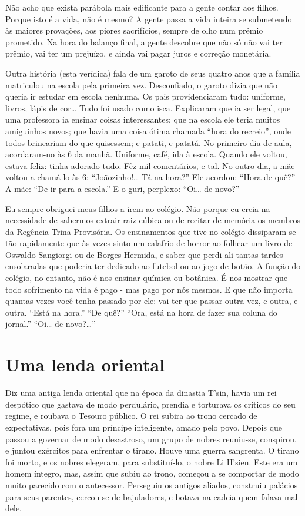 Não acho que exista parábola mais edificante para a gente contar aos
filhos. Porque isto é a vida, não é mesmo?  A gente passa a vida
inteira se submetendo às maiores provações, aos piores sacrifícios,
sempre de olho num prêmio prometido. Na hora do balanço final, a
gente descobre que não só não vai ter prêmio, vai ter um prejuízo, e
ainda vai pagar juros e correção monetária. 

Outra história (esta verídica) fala de um garoto de seus quatro anos
que a família matriculou na escola pela primeira vez. Desconfiado, o
garoto dizia que não queria ir estudar em escola nenhuma. Os pais
providenciaram tudo: uniforme, livros, lápis de cor… Tudo foi usado
como isca. Explicaram que ia ser legal, que uma professora ia ensinar
coisas interessantes; que na escola ele teria muitos amiguinhos
novos; que havia uma coisa ótima chamada “hora do recreio”, onde
todos brincariam do que quisessem; e patati, e patatá.  No primeiro
dia de aula, acordaram-no às 6 da manhã. Uniforme, café, ida à
escola. Quando ele voltou, estava feliz: tinha adorado tudo. Fêz mil
comentários, e tal. No outro dia, a mãe voltou a chamá-lo às 6:
“Joãozinho!… Tá na hora?”  Ele acordou: “Hora de quê?” A mãe: “De ir
para a escola.” E o guri, perplexo: “Oi… de novo?”

Eu sempre obriguei meus filhos a irem ao colégio. Não porque eu creia
na necessidade de sabermos extrair raiz cúbica ou de recitar de
memória os membros da Regência Trina Provisória. Os ensinamentos que
tive no colégio dissiparam-se tão rapidamente que às vezes sinto um
calafrio de horror ao folhear um livro de Oswaldo Sangiorgi ou de
Borges Hermida, e saber que perdi ali tantas tardes ensolaradas que
poderia ter dedicado ao futebol ou ao jogo de botão. A função do
colégio, no entanto, não é nos ensinar química ou botânica. É nos
mostrar que todo sofrimento na vida é pago - mas pago por nós mesmos.
E que não importa quantas vezes você tenha passado por ele: vai ter
que passar outra vez, e outra, e outra. “Está na hora.”  “De quê?”
“Ora, está na hora de fazer sua coluna do jornal.” “Oi… de novo?…”

\chapter{Uma lenda oriental}

Diz uma antiga lenda oriental que na época da dinastia T’sin, havia um
rei despótico que gastava de modo perdulário, prendia e torturava os
críticos do seu regime, e roubava o Tesouro público. O rei subira ao
trono cercado de expectativas, pois fora um príncipe inteligente,
amado pelo povo. Depois que passou a governar de modo desastroso, um
grupo de nobres reuniu-se, conspirou, e juntou exércitos para
enfrentar o tirano.  Houve uma guerra sangrenta. O tirano foi morto,
e os nobres elegeram, para substituí-lo, o nobre Li H’sien. Este era
um homem íntegro, mas, assim que subiu ao trono, começou a se
comportar de modo muito parecido com o antecessor. Perseguiu os
antigos aliados, construiu palácios para seus parentes, cercou-se de
bajuladores, e botava na cadeia quem falava mal dele.


